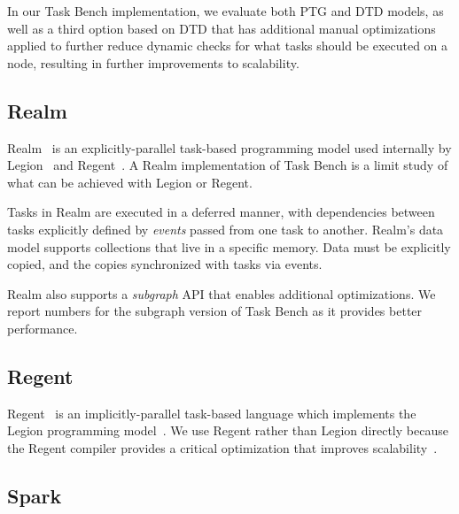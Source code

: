 In our Task Bench implementation, we evaluate both PTG and DTD models,
as well as a third option based on DTD that has additional manual
optimizations applied to further reduce dynamic checks for what tasks
should be executed on a node, resulting in further improvements to
scalability.


\subsection{Realm}

Realm~\cite{Realm14} is an explicitly-parallel task-based programming
model used internally by Legion~\cite{Legion12} and
Regent~\cite{Regent15}. A Realm implementation of Task Bench is a limit study of what can be achieved with Legion or Regent.

Tasks in Realm are executed in a deferred manner, with dependencies
between tasks explicitly defined by \emph{events} passed from one task
to another. Realm's data model supports collections that live in a
specific memory. Data must be explicitly copied, and the copies
synchronized with tasks via events.

Realm also supports a \emph{subgraph} API that enables additional
optimizations. We report numbers for the subgraph version of Task
Bench as it provides better performance.

\subsection{Regent}

Regent~\cite{Regent15} is an implicitly-parallel task-based language
which implements the Legion programming model~\cite{Legion12}. We use
Regent rather than Legion directly because the Regent compiler
provides a critical optimization that
improves scalability~\cite{ControlReplication17}.

\subsection{Spark}

